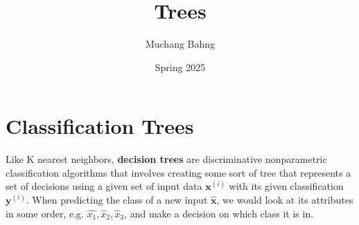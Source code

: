 \documentclass{article}
\begin{document}
\title{Trees}
\author{Muchang Bahng}
\date{Spring 2025}

\maketitle
\tableofcontents
\pagebreak

\section{Classification Trees}

  \begin{definition}
    Like K nearest neighbors, \textbf{decision trees} are discriminative nonparametric classification algorithms that involves creating some sort of tree that represents a set of decisions using a given set of input data $\mathbf{x}^{(i)}$ with its given classification $\mathbf{y}^{(i)}$. When predicting the class of a new input $\hat{\mathbf{x}}$, we would look at its attributes in some order, e.g. $\hat{x_1}, \hat{x}_2, \hat{x}_3$, and make a decision on which class it is in. 


\end{definition}
\end{document}
